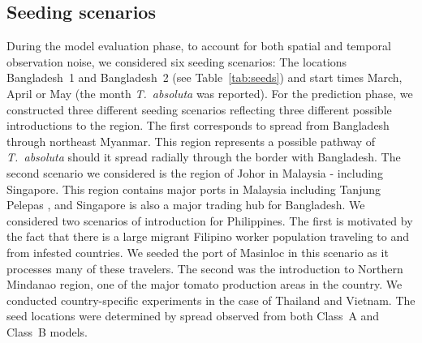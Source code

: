 \documentclass[10pt]{article}
\theoremstyle{definition}
\newcommand{\tuta}{\emph{T.~absoluta}}
\begin{document}
\subsection{Seeding scenarios}
\label{sec:seeds}
During the model evaluation phase, to account for both spatial and temporal
observation noise, we considered six seeding scenarios: The locations
Bangladesh~1 and Bangladesh~2 (see Table~\ref{tab:seeds}) and start times
March, April or May (the month \tuta{} was reported).  For the prediction
phase, we constructed three different seeding scenarios reflecting three
different possible introductions to the region. The first corresponds to
spread from Bangladesh through northeast Myanmar. This region represents a
possible pathway of \tuta{} should it spread radially through the border
with Bangladesh. The second scenario we considered is the region of Johor
in Malaysia - including Singapore. This region contains major ports in
Malaysia including Tanjung Pelepas \cite{khalid2005}, and Singapore is also
a major trading hub for Bangladesh. We considered two scenarios of
introduction for Philippines. The first is motivated by the fact that there
is a large migrant Filipino worker population traveling to and from
infested countries. We seeded the port of Masinloc in this scenario as it
processes many of these travelers. The second was the introduction to
Northern Mindanao region, one of the major tomato production areas in the
country. We conducted country-specific experiments in the case of Thailand
and Vietnam. The seed locations were determined by spread observed from
both Class~A and Class~B models.
\end{document}
